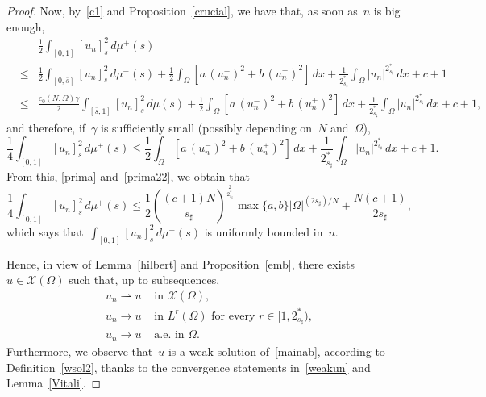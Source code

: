 \documentclass[12pt,a4paper,intlimits,sumlimits]{amsart}
\newcommand{\half}{\frac{1}{2}}
\theoremstyle{definition}
\theoremstyle{plain}
\numberwithin{equation}{section}
\renewcommand{\le}{\leqslant}
\begin{document}
\begin{proof}
Now, by~\eqref{c1} and
Proposition~\ref{crucial}, we have that, as soon as~$n$ is big enough,
\begin{eqnarray*}
&&\frac12\int_{[{{ 0 }}, 1]} [u_n]^2_{s}\, d\mu^+ (s)\\
&\le&\half\int_{[{{ 0 }}, \overline s]} [u_n]^2_s \, d\mu^-(s) +\half \int_\Omega \left[a\, (u_n^-)^2 + b\, (u_n^+)^2\right] \,dx +\frac{1}{2_{s_\sharp}^*} \int_\Omega |u_n|^{2_{s_\sharp}^*}\, dx+c+1\\&\le&
\frac{c_0(N,\Omega)\gamma}2\int_{[ \overline s,1]} [u_n]^2_s \, d\mu(s) +\half \int_\Omega \left[a\, (u_n^-)^2 + b\, (u_n^+)^2\right] \,dx +\frac{1}{2_{s_\sharp}^*} \int_\Omega |u_n|^{2_{s_\sharp}^*}\, dx+c+1,
\end{eqnarray*}
and therefore, if~$\gamma$ is sufficiently small (possibly depending on~$N$ and~$\Omega$),
$$\frac14 \int_{[{{ 0 }}, 1]} [u_n]^2_{s}\, d\mu^+ (s)\le
\half \int_\Omega \left[a\, (u_n^-)^2 + b\, (u_n^+)^2\right] \,dx +\frac{1}{2_{s_\sharp}^*} \int_\Omega |u_n|^{2_{s_\sharp}^*}\, dx+c+1.
$$
{F}rom this, \eqref{prima} and~\eqref{prima22}, we obtain that
$$
\frac14 \int_{[{{ 0 }}, 1]} [u_n]^2_{s}\, d\mu^+ (s)\le
\half \left(\frac{(c+1)N}{s_\sharp}\right)^{\frac2{2^*_{s_\sharp}}} \max\{ a, b\} |\Omega|^{(2 s_\sharp)/N} +\frac{N(c+1)}{2s_\sharp},
$$
which says that~$ \int_{[{{ 0 }}, 1]} [u_n]^2_{s}\, d\mu^+ (s)$
is uniformly bounded in~$n$.

Hence, in view of Lemma~\ref{hilbert} and
Proposition~\ref{emb}, there exists~$u\in \mathcal{X}(\Omega)$ such that, up to subsequences,
\begin{equation}\label{weakun}\begin{split}
u_n\rightharpoonup u &\text{ in } \mathcal{X}(\Omega),\\ 
u_n\to u &\text{ in } L^{r}(\Omega) \text{ for every } r\in [1, 2_{s_\sharp}^*),\\ 
u_n\to u &\text{ a.e. in } \Omega.
\end{split}\end{equation}
Furthermore, we observe that~$u$ is a weak solution of~\eqref{mainab},
according to Definition~\ref{wsol2}, thanks to the convergence statements
in~\eqref{weakun} and Lemma~\ref{Vitali}.


\end{proof}
\end{document}
